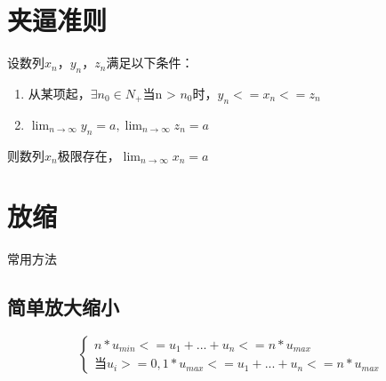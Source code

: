 \section{夹逼准则}

设数列{\(x_n\)}，{\(y_n\)}，{\(z_n\)}满足以下条件：
\begin{enumerate}
    \item 从某项起，\(\exists n_0 \in N_+\)当n > \(n_0\)时，\(y_n <= x_n <= z_n\)
    \item \(\displaystyle \lim_{n \to \infty}y_n = a, \displaystyle \lim_{n \to \infty}z_n = a\)
\end{enumerate}
则数列{\(x_n\)}极限存在，\(\displaystyle \lim_{n \to \infty}x_n = a\)


\section{放缩}
常用方法

\subsection{简单放大缩小}
\[
\begin{cases}
n * u_{min} <= u_1 + ... + u_n <= n * u_{max} \\ 
\text{当}u_i >= 0, 1 * u_{max} <= u_1 + ... + u_n <= n * u_{max}
\end{cases}
\]

